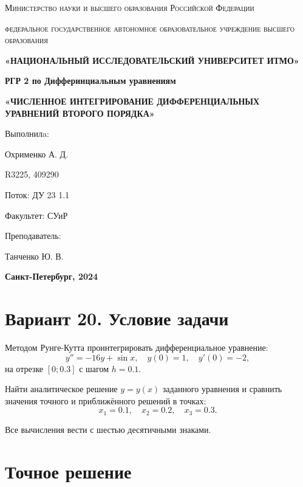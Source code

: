 \documentclass[a4paper,12pt]{article}
\begin{document}
\begin{titlepage}
    \centering
    {\scshape\large Министерство науки и высшего образования Российской Федерации\par}
    {\scshape\large федеральное государственное автономное образовательное учреждение высшего образования\par}
    {\bfseries\large «НАЦИОНАЛЬНЫЙ ИССЛЕДОВАТЕЛЬСКИЙ УНИВЕРСИТЕТ ИТМО»\par}
    \vspace{3cm}
    {\bfseries\Large РГР 2 по Дифферинциальным уравнениям\par}
    \vspace{1cm}
    {\bfseries\large «ЧИСЛЕННОЕ
ИНТЕГРИРОВАНИЕ
ДИФФЕРЕНЦИАЛЬНЫХ
УРАВНЕНИЙ ВТОРОГО
ПОРЯДКА»\par}
    \vfill
    \hspace{0.5\linewidth}%
    \begin{minipage}{0.4\linewidth}
        Выполнилa: \par Охрименко А. Д. \par
        R3225, 409290 \par
        Поток: ДУ 23 1.1 \par
        Факультет: СУиР \par
        Преподаватель: \par
        Танченко Ю. В.
    \end{minipage}
    \vfill
    {\bfseries Санкт-Петербург, 2024\par}
\end{titlepage}






\section{Вариант 20. Условие задачи}
Методом Рунге-Кутта проинтегрировать дифференциальное уравнение:
\[
y'' = -16y + \sin x, \quad y(0) = 1, \quad y'(0) = -2,
\]
на отрезке \([0; 0.3]\) с шагом \(h = 0.1\).

Найти аналитическое решение \(y = y(x)\) заданного уравнения и сравнить значения точного и приближённого решений в точках:
\[
x_1 = 0.1, \quad x_2 = 0.2, \quad x_3 = 0.3.
\]

Все вычисления вести с шестью десятичными знаками.



\section{Точное решение}
\end{document}
